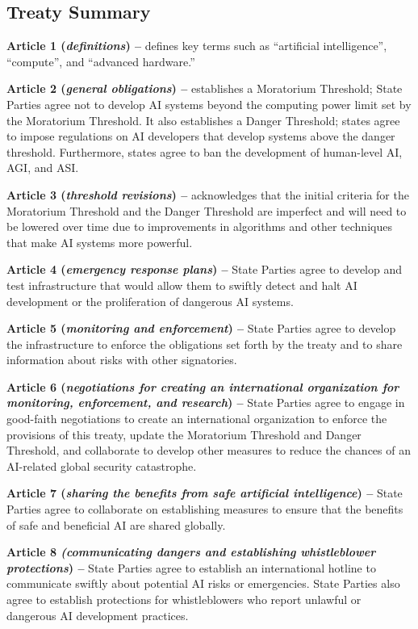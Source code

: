 \documentclass[12pt,a4paper]{article}
\begin{document}
{}
\subsection*{Treaty Summary}

\textbf{Article 1 (\textit{definitions}) –} defines key terms such as “artificial intelligence”, “compute”, and “advanced hardware.”

\textbf{Article 2 (\textit{general obligations}) –} establishes a Moratorium Threshold; State Parties agree not to develop AI systems beyond the computing power limit set by the Moratorium Threshold. It also establishes a Danger Threshold; states agree to impose regulations on AI developers that develop systems above the danger threshold. Furthermore, states agree to ban the development of human-level AI, AGI, and ASI. 

\textbf{Article 3 (\textit{threshold revisions}) –} acknowledges that the initial criteria for the Moratorium Threshold and the Danger Threshold are imperfect and will need to be lowered over time due to improvements in algorithms and other techniques that make AI systems more powerful.

\textbf{Article 4 (\textit{emergency response plans}) –} State Parties agree to develop and test infrastructure that would allow them to swiftly detect and halt AI development or the proliferation of dangerous AI systems.

\textbf{Article 5 (\textit{monitoring and enforcement}) –} State Parties agree to develop the infrastructure to enforce the obligations set forth by the treaty and to share information about risks with other signatories.

\textbf{Article 6 (\textit{negotiations for creating an international organization for monitoring, enforcement, and research}) –} State Parties agree to engage in good-faith negotiations to create an international organization to enforce the provisions of this treaty, update the Moratorium Threshold and Danger Threshold, and collaborate to develop other measures to reduce the chances of an AI-related global security catastrophe.

\textbf{Article 7 (\textit{sharing the benefits from safe artificial intelligence}) –} State Parties agree to collaborate on establishing measures to ensure that the benefits of safe and beneficial AI are shared globally.

\textbf{Article 8 \textit{(communicating dangers and establishing whistleblower protections}) –} State Parties agree to establish an international hotline to communicate swiftly about potential AI risks or emergencies. State Parties also agree to establish protections for whistleblowers who report unlawful or dangerous AI development practices.
\end{document}
